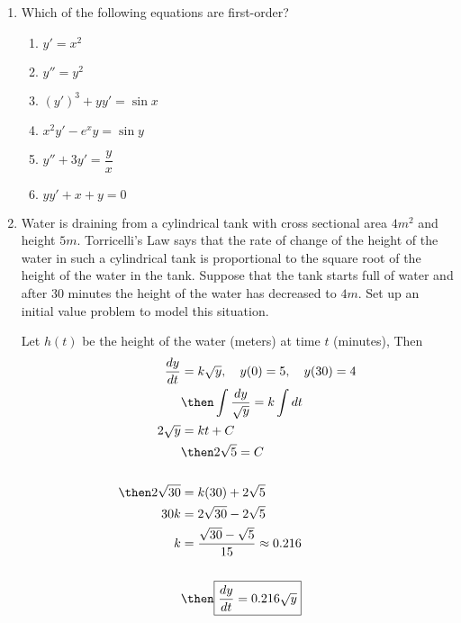 \documentclass{nosvagor-notes}
\begin{document}
\begin{enumerate}
  \item Which of the following equations are first-order?
    \begin{multicols}{2}
      \begin{enumerate}
        \item \(y' = x^2 \) 
        \item \(y'' = y^2\) 
        \item \((y')^3 + yy' = \sin x\) 
        \item \(x^2y' - e^xy = \sin y\) 
        \item \(y'' + 3y' = \dfrac{y}{x}\) 
        \item \(yy' + x + y = 0\) 
      \end{enumerate}
    \end{multicols}

  \newpage

  \item Water is draining from a cylindrical tank with cross sectional area
  \(4m^2\) and height \(5m\). Torricelli’s  Law says that the rate of change of the
  height of the water in such a cylindrical tank is proportional to the square
  root of the height of the water in the tank. Suppose that the tank starts
  full of water and after 30 minutes the height of the water has decreased to
  \(4m\). Set up an initial value problem to model this situation.

  \vspace{30pt}
  Let \(h(t)\) be the height of the water (meters) at time \(t\) (minutes), Then
  \begin{align*}
    \frac{dy}{dt} &= k\sqrt{y}, \quad y(0) = 5, \quad y(30)= 4 \\
    &\then \int \frac{dy}{\sqrt{y} } = k\int dt \\
    2\sqrt{y} &= kt + C \\
    &\then 2\sqrt{5} = C \\\\
    \then 2\sqrt{30} &= k(30) + 2\sqrt{5} \\
    30k &= 2\sqrt{30}-2\sqrt{5} \\
    k &= \frac{\sqrt{30} - \sqrt{5}}{15} \approx 0.216 \\\\
      &\then \boxed{\frac{dy}{dt} = 0.216 \sqrt{y}}
  \end{align*}

  \newpage


\end{enumerate}
\end{document}
